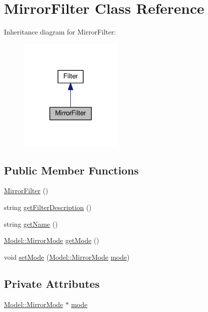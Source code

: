 \hypertarget{classModel_1_1MirrorFilter}{}\section{Mirror\+Filter Class Reference}
\label{classModel_1_1MirrorFilter}


Inheritance diagram for Mirror\+Filter\+:
\nopagebreak
\begin{figure}[H]
\begin{center}
\leavevmode
\includegraphics[width=143pt]{classModel_1_1MirrorFilter__inherit__graph}
\end{center}
\end{figure}
\subsection*{Public Member Functions}
\begin{DoxyCompactItemize}
\item 
\hyperlink{classModel_1_1MirrorFilter_a534aebee3440f56936f691affb8be0d5}{Mirror\+Filter} ()
\item 
string \hyperlink{classModel_1_1MirrorFilter_a62b7b60e24f92234393b840b35808e06}{get\+Filter\+Description} ()
\item 
string \hyperlink{classModel_1_1MirrorFilter_a11335e13e50af74108bf926dc1340b4b}{get\+Name} ()
\item 
\hyperlink{namespaceModel_a8a20195c97d8c704572b5922370c2fbc}{Model\+::\+Mirror\+Mode} \hyperlink{classModel_1_1MirrorFilter_a16d9fccd7fad368d92355882c46ee5e8}{get\+Mode} ()
\item 
void \hyperlink{classModel_1_1MirrorFilter_a1900f4cbb22c7684bd6bbce54560b90f}{set\+Mode} (\hyperlink{namespaceModel_a8a20195c97d8c704572b5922370c2fbc}{Model\+::\+Mirror\+Mode} \hyperlink{classModel_1_1MirrorFilter_ab31669960b71c1d178389716b1122a51}{mode})
\end{DoxyCompactItemize}
\subsection*{Private Attributes}
\begin{DoxyCompactItemize}
\item 
\hyperlink{namespaceModel_a8a20195c97d8c704572b5922370c2fbc}{Model\+::\+Mirror\+Mode} $\ast$ \hyperlink{classModel_1_1MirrorFilter_ab31669960b71c1d178389716b1122a51}{mode}
\end{DoxyCompactItemize}
